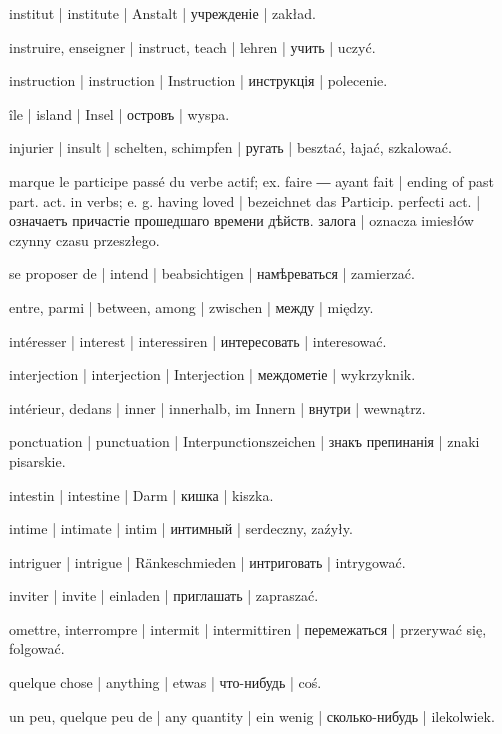 \begin{outdent}{1em}
institut | institute | Anstalt | учрежденіе | zakład.

instruire, enseigner | instruct, teach | lehren | учить | uczyć.

instruction | instruction | Instruction | инструкція | polecenie.

île | island | Insel | островъ | wyspa.

injurier | insult | schelten, schimpfen | ругать | besztać, łajać, szkalować.

marque le participe passé du verbe actif; ex.  faire ―
 ayant fait | ending of past part. act. in verbs;
e. g.  having loved | bezeichnet das Particip. perfecti
act. | означаетъ причастіе прошедшаго времени дѣйств. залога | oznacza
imiesłów czynny czasu przeszłego.

se proposer de | intend | beabsichtigen | намѣреваться | zamierzać.

entre, parmi | between, among | zwischen | между | między.

intéresser | interest | interessiren | интересовать | interesować.

interjection | interjection | Interjection | междометіе | wykrzyknik.

intérieur, dedans | inner | innerhalb, im Innern | внутри | wewnątrz.

ponctuation | punctuation | Interpunctionszeichen | знакъ препинанія | znaki pisarskie.

intestin | intestine | Darm | кишка | kiszka.

intime | intimate | intim | интимный | serdeczny, zaźyły.

intriguer | intrigue | Ränkeschmieden | интриговать | intrygować.

inviter | invite | einladen | приглашать | zapraszać.

omettre, interrompre | intermit | intermittiren | перемежаться | przerywać się, folgować.

quelque chose | anything | etwas | что-нибудь | coś.

un peu, quelque peu de | any quantity | ein wenig | сколько-нибудь | ilekolwiek.


\end{outdent}
